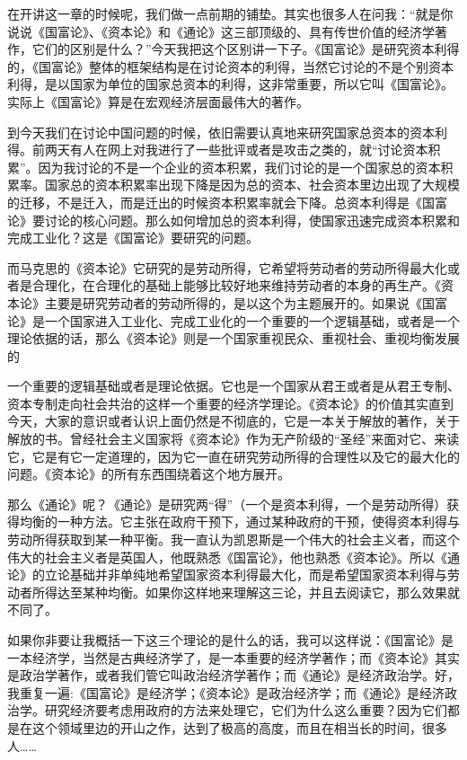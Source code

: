 \documentclass[UTF8, 12pt, a4paper]{ctexrep}
\begin{document}
在开讲这一章的时候呢，我们做一点前期的铺垫。其实也很多人在问我：“就是你说说《国富论》、《资本论》和《通论》这三部顶级的、具有传世价值的经济学著作，它们的区别是什么？”今天我把这个区别讲一下子。《国富论》是研究资本利得的，《国富论》整体的框架结构是在讨论资本的利得，当然它讨论的不是个别资本利得，是以国家为单位的国家总资本的利得，这非常重要，所以它叫《国富论》。实际上《国富论》算是在宏观经济层面最伟大的著作。

到今天我们在讨论中国问题的时候，依旧需要认真地来研究国家总资本的资本利得。前两天有人在网上对我进行了一些批评或者是攻击之类的，就“讨论资本积累”。因为我讨论的不是一个企业的资本积累，我们讨论的是一个国家总的资本积累率。国家总的资本积累率出现下降是因为总的资本、社会资本里边出现了大规模的迁移，不是迁入，而是迁出的时候资本积累率就会下降。总资本利得是《国富论》要讨论的核心问题。那么如何增加总的资本利得，使国家迅速完成资本积累和完成工业化？这是《国富论》要研究的问题。

而马克思的《资本论》它研究的是劳动所得，它希望将劳动者的劳动所得最大化或者是合理化，在合理化的基础上能够比较好地来维持劳动者的本身的再生产。《资本论》主要是研究劳动者的劳动所得的，是以这个为主题展开的。如果说《国富论》是一个国家进入工业化、完成工业化的一个重要的一个逻辑基础，或者是一个理论依据的话，那么《资本论》则是一个国家重视民众、重视社会、重视均衡发展的

一个重要的逻辑基础或者是理论依据。它也是一个国家从君王或者是从君王专制、资本专制走向社会共治的这样一个重要的经济学理论。《资本论》的价值其实直到今天，大家的意识或者认识上面仍然是不彻底的，它是一本关于解放的著作，关于解放的书。曾经社会主义国家将《资本论》作为无产阶级的“圣经”来面对它、来读它，它是有它一定道理的，因为它一直在研究劳动所得的合理性以及它的最大化的问题。《资本论》的所有东西围绕着这个地方展开。

那么《通论》呢？《通论》是研究两“得”（一个是资本利得，一个是劳动所得）获得均衡的一种方法。它主张在政府干预下，通过某种政府的干预，使得资本利得与劳动所得获取到某一种平衡。我一直认为凯恩斯是一个伟大的社会主义者，而这个伟大的社会主义者是英国人，他既熟悉《国富论》，他也熟悉《资本论》。所以《通论》的立论基础并非单纯地希望国家资本利得最大化，而是希望国家资本利得与劳动者所得达至某种均衡。如果你这样地来理解这三论，并且去阅读它，那么效果就不同了。

如果你非要让我概括一下这三个理论的是什么的话，我可以这样说：《国富论》是一本经济学，当然是古典经济学了，是一本重要的经济学著作；而《资本论》其实是政治学著作，或者我们管它叫政治经济学著作；而《通论》是经济政治学。好，我重复一遍:《国富论》是经济学；《资本论》是政治经济学；而《通论》是经济政治学。研究经济要考虑用政府的方法来处理它，它们为什么这么重要？因为它们都是在这个领域里边的开山之作，达到了极高的高度，而且在相当长的时间，很多人……
\end{document}
